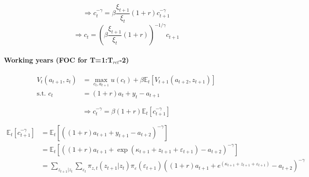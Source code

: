 \documentclass[11pt]{article}
\begin{document}
$$ \Rightarrow c_t^{-\gamma} = \beta \frac{\xi_{t+1}}{\xi_t} (1+r) c_{t+1}^{-\gamma} $$
$$ \Rightarrow c_t = \left(\beta \frac{\xi_{t+1}}{\xi_t} (1+r) \right)^{-1/\gamma} c_{t+1} $$


\paragraph*{Working years (FOC for T=1:T$_{ret}$-2)}

\begin{equation*}
\begin{split}
 V_{t}(a_{t+1}, z_t) &= \max_{c_t,a_{t+1}} u(c_{t}) + \beta \mathbb{E}_t[V_{t+1}(a_{t+2}, z_{t+1})] \\
 \text{s.t. } c_t &= (1+r) a_{t}+y_t - a_{t+1}
\end{split}
\end{equation*}

$$ \Rightarrow c_t^{-\gamma} = \beta (1+r) \mathbb{E}_t [c_{t+1}^{-\gamma}] $$

\begin{equation*}
\begin{split}
\mathbb{E}_t [c_{t+1}^{-\gamma}] &=
      \mathbb{E}_t [\left( (1+r)a_{t+1} + y_{t+1} - a_{t+2} \right)^{-\gamma}] \\
      &= \mathbb{E}_t [\left((1+r)a_{t+1} + \exp(\kappa_{t+1} + z_{t+1} + \varepsilon_{t+1}) - a_{t+2} \right)^{-\gamma}] \\
      &= \sum_{z_{t+1}|z_t} \sum_{\varepsilon_t} \pi_{z,t}(z_{t+1}|z_t) \pi_\varepsilon(\varepsilon_{t+1}) \left((1+r)a_{t+1} + e^{(\kappa_{t+1} + z_{t+1} + \varepsilon_{t+1})} - a_{t+2} \right)^{-\gamma}
\end{split}
\end{equation*}


\end{document}
